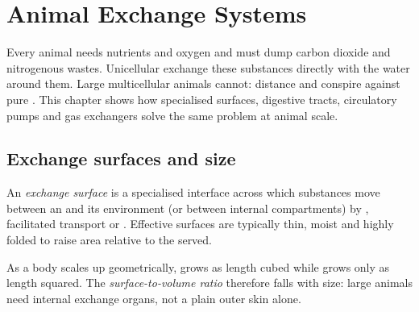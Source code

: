 \chapter{Animal Exchange Systems}\label{ch:g12:animal-exchange}

Every animal  needs nutrients and oxygen and must dump carbon dioxide
and nitrogenous wastes. Unicellular  exchange these substances
directly with the water around them. Large multicellular animals cannot:
distance and  conspire against pure . This chapter shows
how specialised surfaces, digestive tracts, circulatory pumps and gas
exchangers solve the same problem at animal scale.

\section{Exchange surfaces and size}

\begin{definition}\label{def:g12:animal-exchange:surface}
An \emph{exchange surface} is a specialised
interface across which substances move between an  and its
environment (or between internal compartments) by , facilitated
transport or . Effective surfaces are typically thin, moist and
highly folded to raise area relative to the  served.
\end{definition}

\begin{proposition}\label{prop:g12:animal-exchange:sv}
As a body scales up geometrically,  grows as length cubed while
 grows only as length squared. The \emph{surface-to-volume
ratio} therefore falls with size: large
animals need internal exchange organs, not a plain outer skin alone.
\end{proposition}
\admitted

